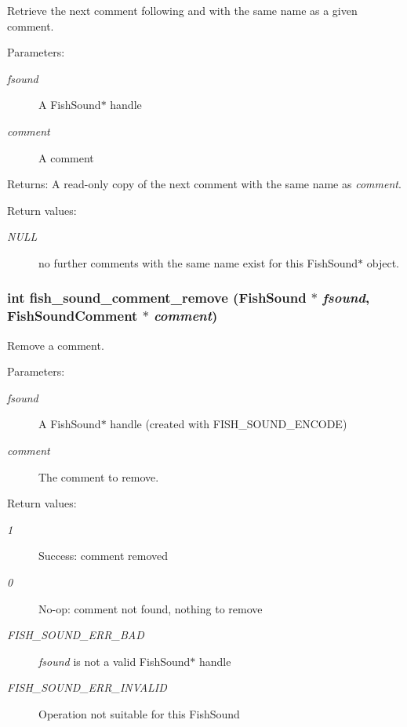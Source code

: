 Retrieve the next comment following and with the same name as a given comment. 

\begin{Desc}
\item[Parameters:]
\begin{description}
\item[{\em fsound}]A Fish\-Sound$\ast$ handle \item[{\em comment}]A comment \end{description}
\end{Desc}
\begin{Desc}
\item[Returns:]A read-only copy of the next comment with the same name as {\em comment\/}. \end{Desc}
\begin{Desc}
\item[Return values:]
\begin{description}
\item[{\em NULL}]no further comments with the same name exist for this Fish\-Sound$\ast$ object. \end{description}
\end{Desc}
\subsubsection{\setlength{\rightskip}{0pt plus 5cm}int fish\_\-sound\_\-comment\_\-remove ({\bf Fish\-Sound} $\ast$ {\em fsound}, {\bf Fish\-Sound\-Comment} $\ast$ {\em comment})}\label{comments_8h_a7}


Remove a comment. 

\begin{Desc}
\item[Parameters:]
\begin{description}
\item[{\em fsound}]A Fish\-Sound$\ast$ handle (created with FISH\_\-SOUND\_\-ENCODE) \item[{\em comment}]The comment to remove. \end{description}
\end{Desc}
\begin{Desc}
\item[Return values:]
\begin{description}
\item[{\em 1}]Success: comment removed \item[{\em 0}]No-op: comment not found, nothing to remove \item[{\em FISH\_\-SOUND\_\-ERR\_\-BAD}]{\em fsound\/} is not a valid Fish\-Sound$\ast$ handle \item[{\em FISH\_\-SOUND\_\-ERR\_\-INVALID}]Operation not suitable for this Fish\-Sound \end{description}
\end{Desc}
